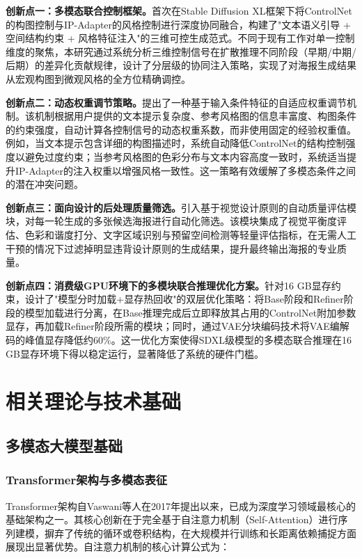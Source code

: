\documentclass[12pt,a4paper]{ctexart}
\newcommand{\sdxl}{Stable Diffusion XL}
\newcommand{\controlnet}{ControlNet}
\newcommand{\ipadapter}{IP-Adapter}
\begin{document}
\textbf{创新点一：多模态联合控制框架。}首次在\sdxl{}框架下将\controlnet{}的构图控制与\ipadapter{}的风格控制进行深度协同融合，构建了"文本语义引导 + 空间结构约束 + 风格特征注入"的三维可控生成范式。不同于现有工作对单一控制维度的聚焦，本研究通过系统分析三维控制信号在扩散推理不同阶段（早期/中期/后期）的差异化贡献规律，设计了分层级的协同注入策略，实现了对海报生成结果从宏观构图到微观风格的全方位精确调控。

\textbf{创新点二：动态权重调节策略。}提出了一种基于输入条件特征的自适应权重调节机制。该机制根据用户提供的文本提示复杂度、参考风格图的信息丰富度、构图条件的约束强度，自动计算各控制信号的动态权重系数，而非使用固定的经验权重值。例如，当文本提示包含详细的构图描述时，系统自动降低\controlnet{}的结构控制强度以避免过度约束；当参考风格图的色彩分布与文本内容高度一致时，系统适当提升\ipadapter{}的注入权重以增强风格一致性。这一策略有效缓解了多模态条件之间的潜在冲突问题。

\textbf{创新点三：面向设计的后处理质量筛选。}引入基于视觉设计原则的自动质量评估模块，对每一轮生成的多张候选海报进行自动化筛选。该模块集成了视觉平衡度评估、色彩和谐度打分、文字区域识别与预留空间检测等轻量评估指标，在无需人工干预的情况下过滤掉明显违背设计原则的生成结果，提升最终输出海报的专业质量。

\textbf{创新点四：消费级GPU环境下的多模块联合推理优化方案。}针对16 GB显存约束，设计了"模型分时加载+显存热回收"的双层优化策略：将Base阶段和Refiner阶段的模型加载进行分离，在Base推理完成后立即释放其占用的\controlnet{}附加参数显存，再加载Refiner阶段所需的模块；同时，通过VAE分块编码技术将VAE编解码的峰值显存降低约60\%。这一优化方案使得SDXL级模型的多模态联合推理在16 GB显存环境下得以稳定运行，显著降低了系统的硬件门槛。

\section{相关理论与技术基础}

\subsection{多模态大模型基础}

\subsubsection{Transformer架构与多模态表征}

Transformer架构自Vaswani等人在2017年提出以来，已成为深度学习领域最核心的基础架构之一。其核心创新在于完全基于自注意力机制（Self-Attention）进行序列建模，摒弃了传统的循环或卷积结构，在大规模并行训练和长距离依赖捕捉方面展现出显著优势。自注意力机制的核心计算公式为：
\end{document}

